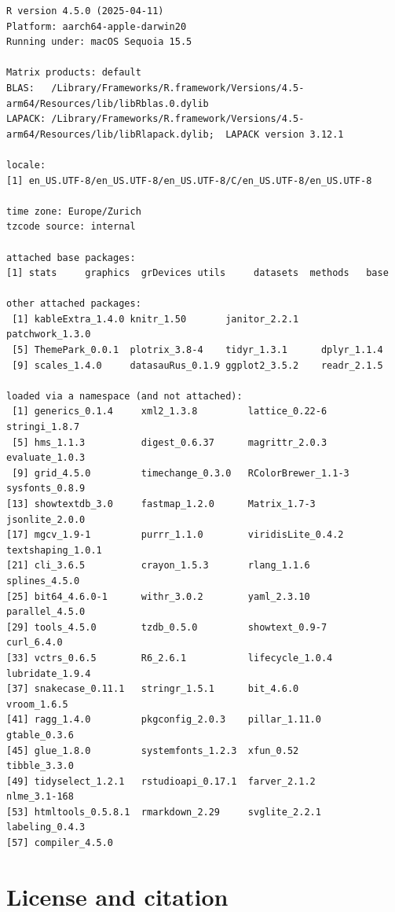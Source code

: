 \documentclass[
  letterpaper,
  DIV=11,
  numbers=noendperiod]{scrreprt}
\begin{document}
\begin{verbatim}
R version 4.5.0 (2025-04-11)
Platform: aarch64-apple-darwin20
Running under: macOS Sequoia 15.5

Matrix products: default
BLAS:   /Library/Frameworks/R.framework/Versions/4.5-arm64/Resources/lib/libRblas.0.dylib 
LAPACK: /Library/Frameworks/R.framework/Versions/4.5-arm64/Resources/lib/libRlapack.dylib;  LAPACK version 3.12.1

locale:
[1] en_US.UTF-8/en_US.UTF-8/en_US.UTF-8/C/en_US.UTF-8/en_US.UTF-8

time zone: Europe/Zurich
tzcode source: internal

attached base packages:
[1] stats     graphics  grDevices utils     datasets  methods   base     

other attached packages:
 [1] kableExtra_1.4.0 knitr_1.50       janitor_2.2.1    patchwork_1.3.0 
 [5] ThemePark_0.0.1  plotrix_3.8-4    tidyr_1.3.1      dplyr_1.1.4     
 [9] scales_1.4.0     datasauRus_0.1.9 ggplot2_3.5.2    readr_2.1.5     

loaded via a namespace (and not attached):
 [1] generics_0.1.4     xml2_1.3.8         lattice_0.22-6     stringi_1.8.7     
 [5] hms_1.1.3          digest_0.6.37      magrittr_2.0.3     evaluate_1.0.3    
 [9] grid_4.5.0         timechange_0.3.0   RColorBrewer_1.1-3 sysfonts_0.8.9    
[13] showtextdb_3.0     fastmap_1.2.0      Matrix_1.7-3       jsonlite_2.0.0    
[17] mgcv_1.9-1         purrr_1.1.0        viridisLite_0.4.2  textshaping_1.0.1 
[21] cli_3.6.5          crayon_1.5.3       rlang_1.1.6        splines_4.5.0     
[25] bit64_4.6.0-1      withr_3.0.2        yaml_2.3.10        parallel_4.5.0    
[29] tools_4.5.0        tzdb_0.5.0         showtext_0.9-7     curl_6.4.0        
[33] vctrs_0.6.5        R6_2.6.1           lifecycle_1.0.4    lubridate_1.9.4   
[37] snakecase_0.11.1   stringr_1.5.1      bit_4.6.0          vroom_1.6.5       
[41] ragg_1.4.0         pkgconfig_2.0.3    pillar_1.11.0      gtable_0.3.6      
[45] glue_1.8.0         systemfonts_1.2.3  xfun_0.52          tibble_3.3.0      
[49] tidyselect_1.2.1   rstudioapi_0.17.1  farver_2.1.2       nlme_3.1-168      
[53] htmltools_0.5.8.1  rmarkdown_2.29     svglite_2.2.1      labeling_0.4.3    
[57] compiler_4.5.0    
\end{verbatim}


\chapter{License and citation}\label{license-and-citation}
\end{document}
